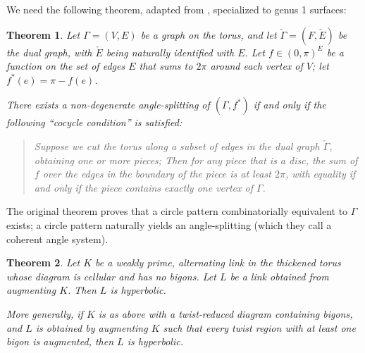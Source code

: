 \documentclass[11pt]{amsart}
\theoremstyle{plain}
\newtheorem{theorem}{Theorem}[section]
\theoremstyle{definition}
\begin{document}
We need the following theorem,
adapted from \cite[Theorem 4]{BandS},
specialized to genus 1 surfaces:


\begin{theorem}{\cite[Theorem 4]{BandS}}
Let $\Gamma = (V,E)$ be a graph on the torus,
and let $\check{\Gamma} = (F,\check{E})$ be the dual graph,
with $\check{E}$ being naturally identified with $E$.
Let $f \in (0,\pi)^E$
be a function on the set of edges $E$
that sums to $2\pi$ around each vertex of $V$;
let $f^*(e) = \pi - f(e)$.


There exists a non-degenerate
angle-splitting of $(\Gamma,f^*)$
if and only if the following
``cocycle condition'' is satisfied:

\begin{quotation}
Suppose we cut the torus along a subset of edges in the dual graph
$\check{\Gamma}$, obtaining one or more pieces;
Then for any piece that is a disc,
the sum of $f$ over the edges in the boundary
of the piece is at least $2\pi$,
with equality if and only if the piece
contains exactly one vertex of $\Gamma$.
\end{quotation}

\label{t:bs-thm4}
\end{theorem}

The original theorem \cite[Theorem 4]{BandS}
proves that a circle pattern combinatorially equivalent to $\Gamma$
exists; a circle pattern naturally yields
an angle-splitting (which they call a coherent angle system).


\begin{theorem}
\label{t:auglink_hyp}
Let $K$ be a weakly prime, alternating link
in the thickened torus
whose diagram is cellular and has no bigons.
Let $L$ be a link obtained from augmenting $K$.
Then $L$ is hyperbolic.


More generally, if $K$ is as above with a twist-reduced diagram
containing bigons,
and $L$ is obtained by augmenting $K$
such that every twist region with at least one bigon is augmented,
then $L$ is hyperbolic.
\end{theorem}
\end{document}
